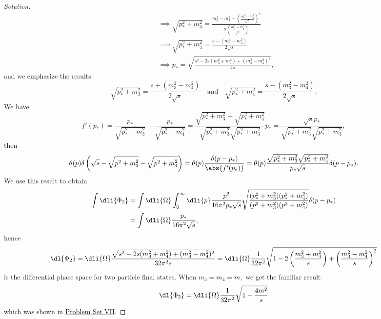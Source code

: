 \begin{proof}[Solution]
\begin{align*}
                                  &\implies \sqrt{p_*^2 + m_4^2} = \frac{m_3^2 - m_4^2 - \left(\frac{m_3^2 - m_4^2}{\sqrt{s}}\right)^2}{2\left(\frac{m_3^2 - m_4^2}{\sqrt{s}}\right)}\\
                                  &\implies \sqrt{p_*^2 + m_4^2} = \frac{s - (m_3^2 - m_4^2)}{2\sqrt{s}}\\
                                  &\implies p_* = \sqrt{\frac{s^2 - 2s(m_3^2 + m_4^2) + (m_3^2 - m_4^2)^2}{4s}},
   \end{align*}
   and we emphasize the results
   \begin{equation*}
      \sqrt{p_*^2 + m_3^2} = \frac{s + (m_3^2 - m_4^2)}{2\sqrt{s}}
      \quad\text{and}\quad
      \sqrt{p_*^2 + m_4^2} = \frac{s - (m_3^2 - m_4^2)}{2\sqrt{s}}.
   \end{equation*}
   We have
   \begin{equation*}
      f'(p_*) = \frac{p_*}{\sqrt{p_*^2 + m_3^2}} + \frac{p_*}{\sqrt{p_*^2 + m_4^2}} = \frac{\sqrt{p_*^2 + m_3^2} + \sqrt{p_*^2 + m_4^2}}{\sqrt{p_*^2 + m_3^2}\sqrt{p_*^2 + m_3^2}}p_* = \frac{\sqrt{s} p_*}{\sqrt{p_*^2 + m_3^2}\sqrt{p_*^2 + m_3^2}},
   \end{equation*}
   then
   \begin{equation*}
      \theta(p) \delta\left(\sqrt{s} - \sqrt{p^2 + m_3^2} - \sqrt{p^2 + m_4^2}\right)
      = \theta(p) \frac{\delta(p - p_*)}{\abs{f'(p_*)}} = \theta(p) \frac{\sqrt{p_*^2 + m_3^2} \sqrt{p_*^2 + m_4^2}}{p_* \sqrt{s}} \delta(p - p_*).
   \end{equation*}
   We use this result to obtain
   \begin{align*}
      \int \dli{\Phi_2} &= \int \dli{\Omega} \int_0^\infty \dli{p} \frac{p^2}{16\pi^2 p_* \sqrt{s}} \sqrt{\frac{(p_*^2 + m_3^2)(p_*^2 + m_4^2)}{(p^2 + m_3^2)(p^2 + m_4^2)}} \delta(p - p_*)\\
                        &= \int \dli{\Omega} \frac{p_*}{16\pi^2 \sqrt{s}},
   \end{align*}
   hence
   \begin{equation*}
      \dl{\Phi_2} = \dli{\Omega} \frac{\sqrt{s^2 - 2s(m_3^2 + m_4^2) + (m_3^2 - m_4^2)^2}}{32 \pi^2 s} = \dli{\Omega} \frac{1}{32\pi^2}\sqrt{1 - 2\left(\frac{m_3^2 + m_4^2}{s}\right) + \left(\frac{m_3^2 - m_4^2}{s}\right)^2}
   \end{equation*}
   is the differential phase space for two particle final states. When \(m_3 = m_4 = m,\) we get the familiar result
   \begin{equation*}
      \dl{\Phi_2} = \dli{\Omega} \frac{1}{32\pi^2} \sqrt{1 - \frac{4m^2}{s}}
   \end{equation*}
   which was shown in \href{https://github.com/louisradial/4305107-quantum-field-theory-i/releases/tag/pset7}{Problem Set VII}.
\end{proof}
